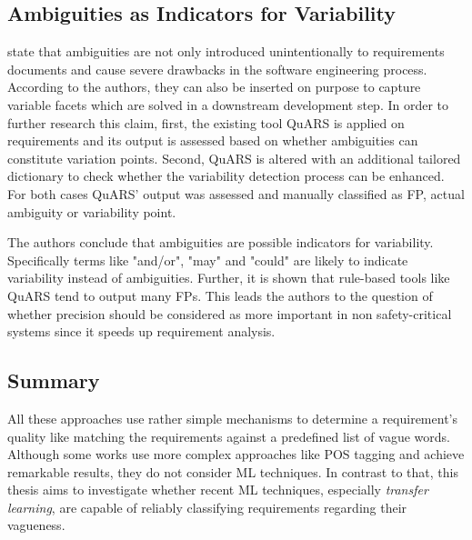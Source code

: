 \subsection{Ambiguities as Indicators for Variability}
\textcite{Fantechi:2018} state that ambiguities are not only introduced unintentionally to requirements documents and cause severe drawbacks in the software engineering process.
According to the authors, they can also be inserted on purpose to capture variable facets which are solved in a downstream development step.
In order to further research this claim, first, the existing tool \ac{QuARS} \parencite{Fabbrini:2002} is applied on requirements and its output is assessed based on whether ambiguities can constitute variation points.
Second, \ac{QuARS} is altered with an additional tailored dictionary to check whether the variability detection process can be enhanced.
For both cases \ac{QuARS}' output was assessed and manually classified as \ac{FP}, actual ambiguity or variability point.

The authors conclude that ambiguities are possible indicators for variability.
Specifically terms like "and/or", "may" and "could" are likely to indicate variability instead of ambiguities.
Further, it is shown that rule-based tools like \ac{QuARS} tend to output many \acp{FP}.
This leads the authors to the question of whether precision should be considered as more important in non safety-critical systems since it speeds up requirement analysis.

\subsection{Summary}
All these approaches use rather simple mechanisms to determine a requirement's quality like matching the requirements against a predefined list of vague words.
Although some works use more complex approaches like \ac{POS} tagging and achieve remarkable results, they do not consider \ac{ML} techniques.
In contrast to that, this thesis aims to investigate whether recent \ac{ML} techniques, especially \textit{transfer learning}, are capable of reliably classifying requirements regarding their vagueness.
